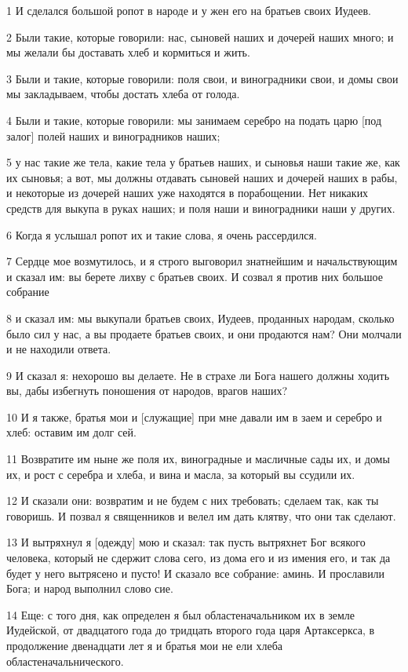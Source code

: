 \par 1 И сделался большой ропот в народе и у жен его на братьев своих Иудеев.
\par 2 Были такие, которые говорили: нас, сыновей наших и дочерей наших много; и мы желали бы доставать хлеб и кормиться и жить.
\par 3 Были и такие, которые говорили: поля свои, и виноградники свои, и домы свои мы закладываем, чтобы достать хлеба от голода.
\par 4 Были и такие, которые говорили: мы занимаем серебро на подать царю [под залог] полей наших и виноградников наших;
\par 5 у нас такие же тела, какие тела у братьев наших, и сыновья наши такие же, как их сыновья; а вот, мы должны отдавать сыновей наших и дочерей наших в рабы, и некоторые из дочерей наших уже находятся в порабощении. Нет никаких средств для выкупа в руках наших; и поля наши и виноградники наши у других.
\par 6 Когда я услышал ропот их и такие слова, я очень рассердился.
\par 7 Сердце мое возмутилось, и я строго выговорил знатнейшим и начальствующим и сказал им: вы берете лихву с братьев своих. И созвал я против них большое собрание
\par 8 и сказал им: мы выкупали братьев своих, Иудеев, проданных народам, сколько было сил у нас, а вы продаете братьев своих, и они продаются нам? Они молчали и не находили ответа.
\par 9 И сказал я: нехорошо вы делаете. Не в страхе ли Бога нашего должны ходить вы, дабы избегнуть поношения от народов, врагов наших?
\par 10 И я также, братья мои и [служащие] при мне давали им в заем и серебро и хлеб: оставим им долг сей.
\par 11 Возвратите им ныне же поля их, виноградные и масличные сады их, и домы их, и рост с серебра и хлеба, и вина и масла, за который вы ссудили их.
\par 12 И сказали они: возвратим и не будем с них требовать; сделаем так, как ты говоришь. И позвал я священников и велел им дать клятву, что они так сделают.
\par 13 И вытряхнул я [одежду] мою и сказал: так пусть вытряхнет Бог всякого человека, который не сдержит слова сего, из дома его и из имения его, и так да будет у него вытрясено и пусто! И сказало все собрание: аминь. И прославили Бога; и народ выполнил слово сие.
\par 14 Еще: с того дня, как определен я был областеначальником их в земле Иудейской, от двадцатого года до тридцать второго года царя Артаксеркса, в продолжение двенадцати лет я и братья мои не ели хлеба областеначальнического.
